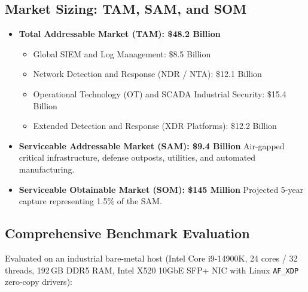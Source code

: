 \documentclass[11pt,a4paper]{article}
\begin{document}
\subsection{Market Sizing: TAM, SAM, and SOM}
\begin{itemize}
    \item \textbf{Total Addressable Market (TAM): \$48.2 Billion}
    \begin{itemize}
        \item Global SIEM and Log Management: \$8.5 Billion
        \item Network Detection and Response (NDR / NTA): \$12.1 Billion
        \item Operational Technology (OT) and SCADA Industrial Security: \$15.4 Billion
        \item Extended Detection and Response (XDR Platforms): \$12.2 Billion
    \end{itemize}
    \item \textbf{Serviceable Addressable Market (SAM): \$9.4 Billion}
    Air-gapped critical infrastructure, defense outposts, utilities, and automated manufacturing.
    \item \textbf{Serviceable Obtainable Market (SOM): \$145 Million}
    Projected 5-year capture representing 1.5\% of the SAM.
\end{itemize}

\subsection{Comprehensive Benchmark Evaluation}
Evaluated on an industrial bare-metal host (Intel Core i9-14900K, 24 cores / 32 threads, 192\,GB DDR5 RAM, Intel X520 10GbE SFP+ NIC with Linux \texttt{AF\_XDP} zero-copy drivers):
\end{document}
